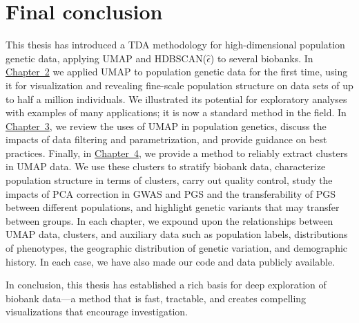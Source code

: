 \section{Final conclusion}
This thesis has introduced a TDA methodology for high-dimensional population genetic data, applying UMAP and HDBSCAN($\hat{\epsilon}$) to several biobanks. In \hyperref[chap:chapter1]{Chapter~2} we applied UMAP to population genetic data for the first time, using it for visualization and revealing fine-scale population structure on data sets of up to half a million individuals. We illustrated its potential for exploratory analyses with examples of many applications; it is now a standard method in the field. In \hyperref[chap:chapter2]{Chapter~3}, we review the uses of UMAP in population genetics, discuss the impacts of data filtering and parametrization, and provide guidance on best practices. Finally, in \hyperref[chap:chapter3]{Chapter~4}, we provide a method to reliably extract clusters in UMAP data. We use these clusters to stratify biobank data, characterize population structure in terms of clusters, carry out quality control, study the impacts of PCA correction in GWAS and PGS and the transferability of PGS between different populations, and highlight genetic variants that may transfer between groups. In each chapter, we expound upon the relationships between UMAP data, clusters, and auxiliary data such as population labels, distributions of phenotypes, the geographic distribution of genetic variation, and demographic history. In each case, we have also made our code and data publicly available. 

In conclusion, this thesis has established a rich basis for deep exploration of biobank data---a method that is fast, tractable, and creates compelling visualizations that encourage investigation.

\clearpage


